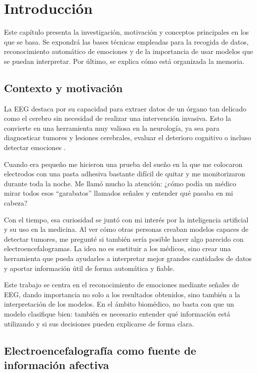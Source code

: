 
\chapter{Introducción}
\label{cap:introduccion}
\setcounter{page}{1}

Este capítulo presenta la investigación, motivación y conceptos principales en los que se basa. Se expondrá las bases técnicas empleadas para la recogida de datos, reconocimiento automático de emociones y de la importancia de usar modelos que se puedan interpretar. Por último, se explica cómo está organizada la memoria.


\section{Contexto y motivación}

La \ac{EEG} destaca por su capacidad para extraer datos de un órgano tan delicado como el cerebro sin necesidad de realizar una intervención invasiva. Esto la convierte en una herramienta muy valiosa en la neurología, ya sea para diagnosticar tumores y lesiones cerebrales, evaluar el deterioro cognitivo o incluso detectar emociones \cite{mayo2024eeg}.

Cuando era pequeño me hicieron una prueba del sueño en la que me colocaron electrodos con una pasta adhesiva bastante difícil de quitar y me monitorizaron durante toda la noche. Me llamó mucho la atención: ¿cómo podía un médico mirar todos esos “garabatos” llamados señales y entender qué pasaba en mi cabeza?

Con el tiempo, esa curiosidad se juntó con mi interés por la inteligencia artificial y su uso en la medicina. Al ver cómo otras personas creaban modelos capaces de detectar tumores, me pregunté si también sería posible hacer algo parecido con electroencefalogramas. La idea no es sustituir a los médicos, sino crear una herramienta que pueda ayudarles a interpretar mejor grandes cantidades de datos y aportar información útil de forma automática y fiable.

Este trabajo se centra en el reconocimiento de emociones mediante señales de \ac{EEG}, dando importancia no solo a los resultados obtenidos, sino también a la interpretación de los modelos. En el ámbito biomédico, no basta con que un modelo clasifique bien: también es necesario entender qué información está utilizando y si sus decisiones pueden explicarse de forma clara.


\section{Electroencefalografía como fuente de información afectiva}


